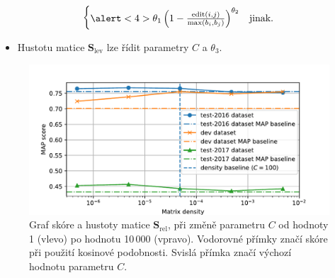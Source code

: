 \documentclass[aspectratio=169,t]{beamer}
\let\abbr\relax
\begin{document}
\begin{frame}
\begin{itemize}
\begin{equation*}
\begin{cases}
        \alert<4>{\theta_1\left(1-\frac{\operatorname{edit}(i, j)}{\max(b_i, b_j)}\right)^{\theta_2}} & \index{.h1@$\theta_1$|emph}\index{.h2@$\theta_2$|emph}\index{.h3@$\theta _3$|emph}\text{jinak.}
      \end{cases}
    \end{equation*}
    \begin{itemize}
      \item<5-> \alert<3>{Hustotu} matice $\mathbf{S}_{\text{lev}}$ \alert<5>{lze
        řídit parametry $C$ a $\theta_3$}.
    \end{itemize}
\end{itemize}
\end{frame}

\begin{frame}[c]
\begin{figure}
\vfill
\begin{center}
\includegraphics[scale=0.65]{figs/fig2}
\end{center}
  \caption{Graf \abbr{MAP} skóre a hustoty matice $\mathbf S_{\text{rel}}$, \alert{při
  změně parametru $C$} od hodnoty 1 (vlevo) po hodnotu 10\,000 (vpravo).
  Vodorovné přímky značí \abbr{MAP} skóre při použití kosinové podobnosti.
  Svislá přímka značí výchozí hodnotu parametru $C$.}
\end{figure}
\end{frame}
\end{document}
